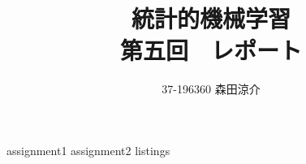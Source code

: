 \documentclass[dvipdfmx, fleqn, titlepage]{jsarticle}
\title{
	統計的機械学習 \\
	第五回　レポート
	}
\author{37-196360 \quad 森田涼介}
\begin{document}
\maketitle
{assignment1}
\clearpage
{assignment2}
\clearpage
{listings}
\end{document}
